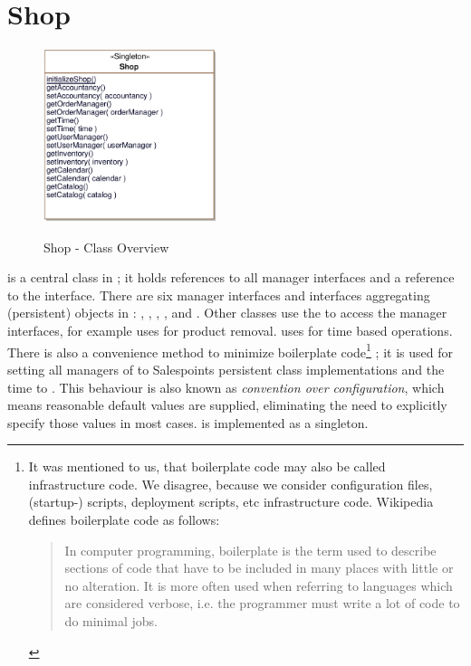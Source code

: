 \section{Shop}
\label{shop}
\label{sec:shop}

\begin{figure}[ht]
	\centering
  \includegraphics[width=0.45\textwidth]{images/Shop_Overview.eps}
	\label{shop_overview}
	\caption{Shop - Class Overview}
\end{figure}
 is a central class in \salespoint{}; it holds references to all manager interfaces and a reference to the  interface.
There are six manager interfaces and interfaces aggregating (persistent) objects in \salespoint{}: , , , ,  and .
Other classes use the  to access the manager interfaces, for example  uses  for product removal.
 uses  for time based operations.
There is also a convenience method to minimize boilerplate code\footnote{
	It was mentioned to us, that boilerplate code may also be called infrastructure code.
	We disagree, because we consider configuration files, (startup-) scripts, deployment scripts, etc infrastructure code.
	Wikipedia defines boilerplate code as follows:
	\begin{quote}
		In computer programming, boilerplate is the term used to describe sections of code that have to be included in many places with little or no alteration.
		It is more often used when referring to languages which are considered verbose, i.e. the programmer must write a lot of code to do minimal jobs.
	\end{quote}}
;
it is used for setting all managers of  to Salespoints persistent class implementations and the time to .
This behaviour is also known as \textit{convention over configuration}, which means reasonable default values are supplied, eliminating the need to explicitly specify those values in most cases.
 is implemented as a singleton.

